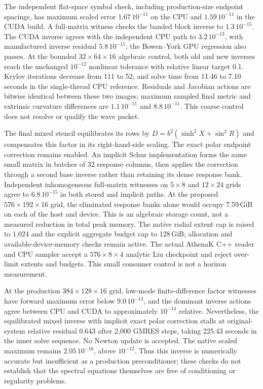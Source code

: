 \documentclass[aps,prd,preprint,notitlepage,nofootinbib]{revtex4-2}
\begin{document}
The independent flat-space symbol check, including production-size
endpoint spacings, has maximum scaled error $1.67\,10^{-11}$ on the CPU
and $1.59\,10^{-11}$ in the CUDA build. A full-matrix witness checks
the banded block inverse to $1.3\,10^{-15}$. The CUDA inverse agrees
with the independent CPU path to $3.2\,10^{-13}$, with manufactured
inverse residual $5.8\,10^{-15}$; the Bowen--York GPU regression also
passes. At the bounded $32\times64\times16$ algebraic control, both
old and new inverses reach the unchanged $10^{-12}$ nonlinear tolerance
with relative linear target 0.1. Krylov iterations decrease from 111
to 52, and solve time from 11.46 to 7.10 seconds in the single-thread
CPU reference. Residuals and Jacobian actions are bitwise identical
between these two images; maximum sampled final metric and extrinsic
curvature differences are $1.1\,10^{-11}$ and $8.8\,10^{-11}$.
This coarse control does not resolve or qualify the wave packet.

The final mixed stencil equilibrates its rows by
$D=b^2(\sinh^2X+\sin^2R)$ and compensates this factor in its right-hand-side
scaling. The exact polar endpoint correction remains enabled. An implicit
Schur implementation forms the same small matrix in batches of 32 response
columns, then applies the correction through a second base inverse rather
than retaining its dense response bank. Independent inhomogeneous full-matrix
witnesses on $5\times8$ and $12\times24$ grids agree to
$6.8\,10^{-15}$ in both stored and implicit paths. At the proposed
$576\times192\times16$ grid, the eliminated response banks alone would
occupy 7.59\,GiB on each of the host and device. This is an algebraic storage
count, not a measured reduction in total peak memory. The native radial
extent cap is raised to 1,024 and the explicit aggregate budget cap to
128\,GiB; allocation and available-device-memory checks remain active.
The actual AthenaK C++ reader and CPU sampler accept a $576\times8\times4$
analytic Liu checkpoint and reject over-limit extents and budgets. This
small consumer control is not a horizon measurement.

At the production $384\times128\times16$ grid, low-mode finite-difference
factor witnesses have forward maximum error below $9.0\,10^{-13}$, and
the dominant inverse actions agree between CPU and CUDA to approximately
$10^{-14}$ relative. Nevertheless, the equilibrated mixed inverse with
implicit exact polar correction stalls at original-system relative
residual 0.643 after 2,000 GMRES steps, taking 225.43 seconds in the inner
solve sequence. No Newton update is accepted. The native scaled maximum
remains $2.05\,10^{-10}$, above $10^{-12}$. Thus this inverse is numerically
accurate but insufficient as a production preconditioner; these checks do
not establish that the spectral equations themselves are free of
conditioning or regularity problems.
\end{document}
